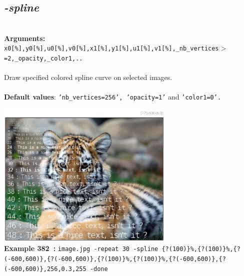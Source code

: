 \documentclass[a4paper,11pt,twoside]{book}
\begin{document}
\subsection{\emph{-spline} }\vspace*{-0.5em}
~\\\textbf{Arguments: } 
{\small \texttt{x0[\%],y0[\%],u0[\%],v0[\%],x1[\%],y1[\%],u1[\%],v1[\%],\_nb\_vertices$>$=2,\_opacity,\_color1,..}}\\~\\
Draw specified colored spline curve on selected images.
~\\~\\\textbf{Default values}: {\small \texttt{'nb\_vertices=256', 'opacity=1'} and \texttt{'color1=0'.}}
\begin{center}\includegraphics[keepaspectratio=true,height=7cm,width=\textwidth]{img/gmic_def382.jpg}\\
{\footnotesize \textbf{Example 382~:} \texttt{image.jpg -repeat 30 -spline \{?(100)\}\%,\{?(100)\}\%,\{?(-600,600)\},\{?(-600,600)\},\{?(100)\}\%,\{?(100)\}\%,\{?(-600,600)\},\{?(-600,600)\},256,0.3,255 -done}}
\end{center}
\end{document}
